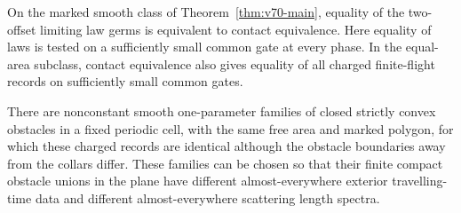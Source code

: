 \begin{corollary}
\label{cor:v71-local-completion}
On the marked smooth class of Theorem~\ref{thm:v70-main}, equality of
the two-offset limiting law germs is equivalent to contact equivalence.
Here equality of laws is tested on a sufficiently small common gate at
every phase.  In the equal-area subclass, contact equivalence also gives
equality of all charged finite-flight records on sufficiently small
common gates.

There are nonconstant smooth one-parameter families of closed strictly
convex obstacles in a fixed periodic cell, with the same free area and
marked polygon, for which these charged records are identical although
the obstacle boundaries away from the collars differ.  These families
can be chosen so that their finite compact obstacle unions in the plane
have different almost-everywhere exterior travelling-time data and
different almost-everywhere scattering length spectra.
\end{corollary}
